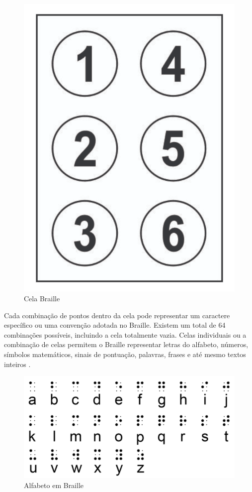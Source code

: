 \begin{figure}[h]
    \centering
    \includegraphics[scale=0.4]{ch02/assets/braille-cell.png}
    \decoRule
    \caption[Cela Braille]{Cela Braille}
    \label{fig:ch02-braille-cell}
\end{figure}

Cada combinação de pontos dentro da cela pode representar um caractere específico ou uma convenção adotada no Braille. Existem um total de 64 combinações possíveis, incluindo a cela totalmente vazia. Celas individuais ou a combinação de celas permitem o Braille representar letras do alfabeto, números, símbolos matemáticos, sinais de pontuação, palavras, frases e até mesmo textos inteiros \parencite{REF05}.

\begin{figure}[h]
    \centering
    \includegraphics[scale=0.5]{ch02/assets/braille-alphabet.png}
    \decoRule
    \caption[Alfabeto em Braille]{Alfabeto em Braille}
    \label{fig:ch02-braille-alphabet}
\end{figure}

